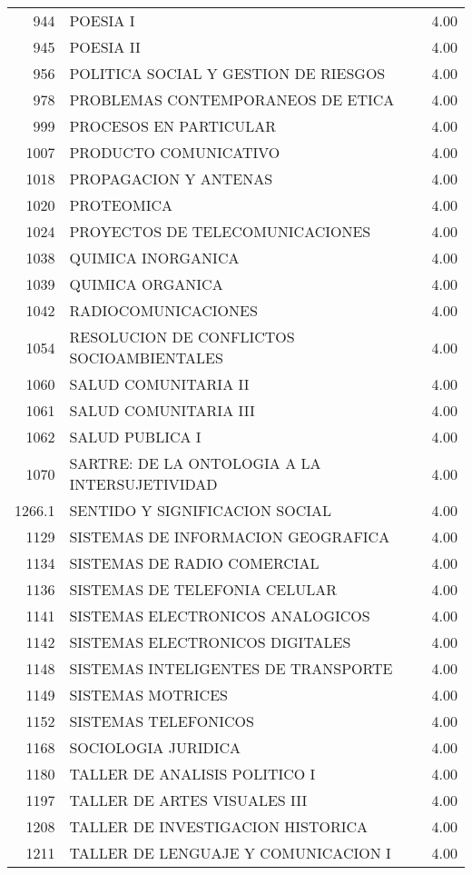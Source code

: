 \documentclass[12pt]{article}
\begin{document}
\begin{table}[ht]
{\begin{tabular}{rlr}
  944 & POESIA I & 4.00 \\ 
  945 & POESIA II & 4.00 \\ 
  956 & POLITICA SOCIAL Y GESTION DE RIESGOS & 4.00 \\ 
  978 & PROBLEMAS CONTEMPORANEOS DE ETICA & 4.00 \\ 
  999 & PROCESOS EN PARTICULAR & 4.00 \\ 
  1007 & PRODUCTO COMUNICATIVO & 4.00 \\ 
  1018 & PROPAGACION Y ANTENAS & 4.00 \\ 
  1020 & PROTEOMICA & 4.00 \\ 
  1024 & PROYECTOS DE TELECOMUNICACIONES & 4.00 \\ 
  1038 & QUIMICA INORGANICA & 4.00 \\ 
  1039 & QUIMICA ORGANICA & 4.00 \\ 
  1042 & RADIOCOMUNICACIONES & 4.00 \\ 
  1054 & RESOLUCION DE CONFLICTOS SOCIOAMBIENTALES & 4.00 \\ 
  1060 & SALUD COMUNITARIA II & 4.00 \\ 
  1061 & SALUD COMUNITARIA III & 4.00 \\ 
  1062 & SALUD PUBLICA I & 4.00 \\ 
  1070 & SARTRE: DE LA ONTOLOGIA A LA INTERSUJETIVIDAD & 4.00 \\ 
  1266.1 & SENTIDO Y SIGNIFICACION SOCIAL & 4.00 \\ 
  1129 & SISTEMAS DE INFORMACION GEOGRAFICA & 4.00 \\ 
  1134 & SISTEMAS DE RADIO COMERCIAL & 4.00 \\ 
  1136 & SISTEMAS DE TELEFONIA CELULAR & 4.00 \\ 
  1141 & SISTEMAS ELECTRONICOS ANALOGICOS & 4.00 \\ 
  1142 & SISTEMAS ELECTRONICOS DIGITALES & 4.00 \\ 
  1148 & SISTEMAS INTELIGENTES DE TRANSPORTE & 4.00 \\ 
  1149 & SISTEMAS MOTRICES & 4.00 \\ 
  1152 & SISTEMAS TELEFONICOS & 4.00 \\ 
  1168 & SOCIOLOGIA JURIDICA & 4.00 \\ 
  1180 & TALLER DE ANALISIS POLITICO I & 4.00 \\ 
  1197 & TALLER DE ARTES VISUALES III & 4.00 \\ 
  1208 & TALLER DE INVESTIGACION HISTORICA & 4.00 \\ 
  1211 & TALLER DE LENGUAJE Y COMUNICACION I & 4.00 \\ 

\end{tabular}}
\end{table}
\end{document}
